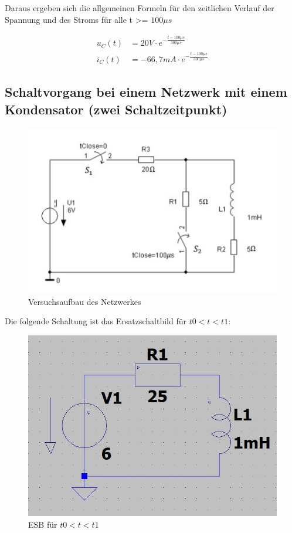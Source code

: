 \documentclass{article}
\begin{document}
Daraus ergeben sich die allgemeinen Formeln für den zeitlichen Verlauf der Spannung und des Stroms für alle t >= $100\mu s$

\begin{align*}
  u_C(t)&= 20V \cdot e^{-\frac{t-100\mu s}{300\mu s}}\\
  i_C(t)&= -66,7mA \cdot e^{-\frac{t-100\mu s}{300\mu s}}
\end{align*}

\newpage

\subsection{Schaltvorgang bei einem Netzwerk mit einem Kondensator (zwei Schaltzeitpunkt)}

\begin{figure}[h]
  \begin{center}
    \includegraphics[scale=1]{../assets/images/ET2P5/vorbereitung 3.jpg}
    \caption{Versuchsaufbau des Netzwerkes}
  \end{center}
\end{figure}

Die folgende Schaltung ist das Ersatzschaltbild für $t0 < t < t1$:
\begin{figure}[h]
  \begin{center}
    \includegraphics[scale=0.3]{../assets/images/ET2P5/t0 t t1.JPG}
    \caption{ESB für $t0 < t < t1$ }
  \end{center}
\end{figure}
\end{document}
